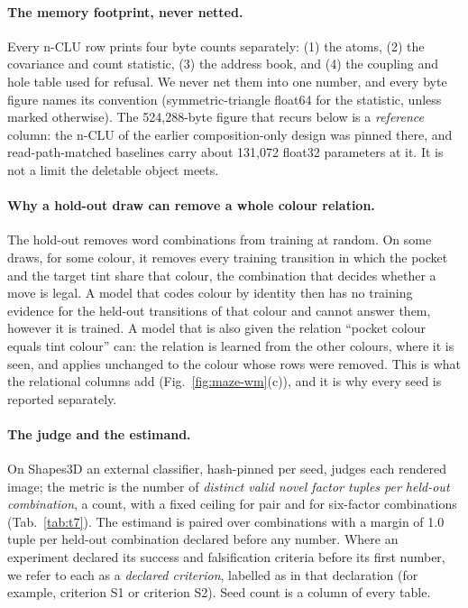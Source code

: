\documentclass{article} %
\begin{document}
\paragraph{The memory footprint, never netted.} Every n-CLU row prints four byte counts
separately: (1) the atoms, (2) the covariance and count statistic, (3) the address book, and
(4) the coupling and hole table used for refusal. We never net them into one number, and every
byte figure names its convention (symmetric-triangle float64 for the statistic, unless marked
otherwise). The 524,288-byte figure that recurs below is a \emph{reference} column: the n-CLU
of the earlier composition-only design was pinned there, and read-path-matched baselines carry
about 131,072 float32 parameters at it. %
It is not a limit the deletable object meets.

\paragraph{Why a hold-out draw can remove a whole colour relation.} The hold-out removes word
combinations from training at random. On some draws, for some colour, it removes every training
transition in which the pocket and the target tint share that colour, the combination that decides
whether a move is legal. A model that codes colour by identity then has no training evidence for the
held-out transitions of that colour and cannot answer them, however it is trained. A model that is
also given the relation ``pocket colour equals tint colour'' can: the relation is learned from the
other colours, where it is seen, and applies unchanged to the colour whose rows were removed. This is
what the relational columns add (Fig.~\ref{fig:maze-wm}(c)), and it is why every seed is reported
separately.

\paragraph{The judge and the estimand.} On Shapes3D an external classifier, hash-pinned per
seed, judges each rendered image; the metric is the number of \emph{distinct valid novel
factor tuples per held-out combination}, a count, with a fixed ceiling for pair and for six-factor
combinations (Tab.~\ref{tab:t7}). The estimand is paired over combinations with a margin of 1.0 tuple per held-out combination declared
before any number. %
Where an experiment declared its success and falsification criteria before its first
number, we refer to each as a \emph{declared criterion}, labelled as in that
declaration (for example, criterion S1 or criterion S2).
Seed count is a column of every table.
\end{document}
